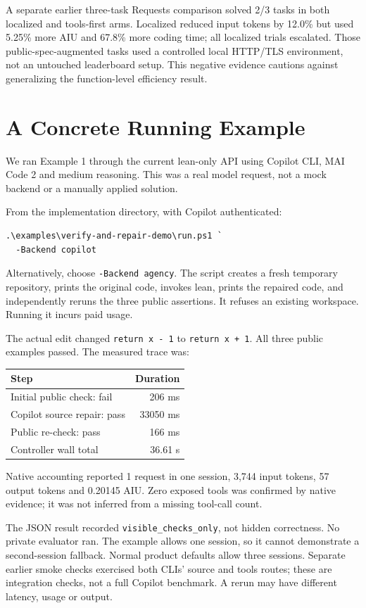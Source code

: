 \documentclass[10pt,twocolumn,a4paper]{article}
\begin{document}
A separate earlier three-task Requests comparison solved 2/3 tasks in both
localized and tools-first arms. Localized reduced input tokens by 12.0\%
but used 5.25\% more AIU and 67.8\% more coding time; all localized trials
escalated. Those public-spec-augmented tasks used a controlled local HTTP/TLS
environment, not an untouched leaderboard setup. This negative evidence
cautions against generalizing the function-level efficiency result.

\section{A Concrete Running Example}
\label{sec:running}
We ran Example 1 through the current lean-only API using Copilot CLI,
MAI Code 2 and medium reasoning. This was a real model request, not a
mock backend or a manually applied solution.

From the implementation directory, with Copilot authenticated:
\begin{lstlisting}
.\examples\verify-and-repair-demo\run.ps1 `
  -Backend copilot
\end{lstlisting}
Alternatively, choose \texttt{-Backend agency}. The script creates a fresh
temporary repository, prints the original code, invokes lean, prints the
repaired code, and independently reruns the three public assertions.
It refuses an existing workspace. Running it incurs paid usage.

The actual edit changed \texttt{return x - 1} to \texttt{return x + 1}.
All three public examples passed. The measured trace was:
\begin{center}\small
\begin{tabular}{lr}
\toprule
Step & Duration\\
\midrule
Initial public check: fail & 206 ms\\
Copilot source repair: pass & 33050 ms\\
Public re-check: pass & 166 ms\\
Controller wall total & 36.61 s\\
\bottomrule
\end{tabular}
\end{center}
Native accounting reported 1 request in one session,
3,744 input tokens, 57 output tokens and
0.20145 AIU. Zero exposed tools was confirmed by native evidence;
it was not inferred from a missing tool-call count.

The JSON result recorded \texttt{visible\_checks\_only}, not hidden
correctness. No private evaluator ran. The example allows one session,
so it cannot demonstrate a second-session fallback. Normal product defaults
allow three sessions. Separate earlier smoke checks exercised both CLIs'
source and tools routes; these are integration checks, not a full Copilot
benchmark. A rerun may have different latency, usage or output.
\end{document}
